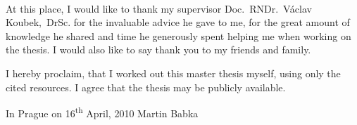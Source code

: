 \normalsize
\setcounter{page}{2}
\ \vspace{10mm} 

\noindent At this place, I would like to thank my supervisor Doc.~RNDr.~Václav Koubek,~DrSc. for the invaluable advice he gave to me, for the great amount of knowledge he shared and time he generously spent helping me when working on the thesis. I would also like to say thank you to my friends and family.

\vspace{\fill}
\noindent I hereby proclaim, that I worked out this master thesis myself, using only the cited resources. I agree that the thesis may be publicly available.

\bigskip
\noindent In Prague on 16\textsuperscript{th} April, 2010 \hspace{\fill}Martin Babka

\tableofcontents 

\newpage 

